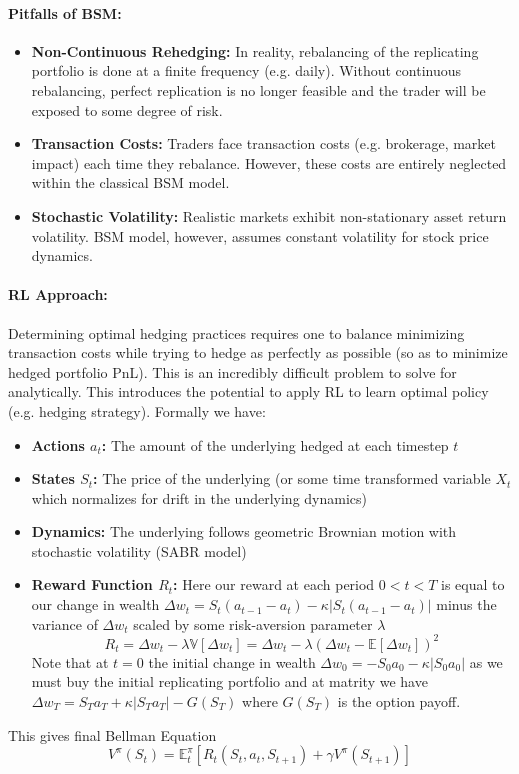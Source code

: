 \documentclass{article}
\begin{document}
\paragraph{Pitfalls of BSM:}
\begin{itemize}
    \item \textbf{Non-Continuous Rehedging:} In reality, rebalancing of the replicating portfolio is done at a finite frequency (e.g. daily). Without continuous rebalancing, perfect replication is no longer feasible and the trader will be exposed to some degree of risk.
    \item \textbf{Transaction Costs:} Traders face transaction costs (e.g. brokerage, market impact) each time they rebalance. However, these costs are entirely neglected within the classical BSM model.
    \item \textbf{Stochastic Volatility:} Realistic markets exhibit non-stationary asset return volatility. BSM model, however, assumes constant volatility for stock price dynamics.
\end{itemize}

\paragraph{RL Approach:} Determining optimal hedging practices requires one to balance minimizing transaction costs while trying to hedge as perfectly as possible (so as to minimize hedged portfolio PnL). This is an incredibly difficult problem to solve for analytically. This introduces the potential to apply RL to learn optimal policy (e.g. hedging strategy). Formally we have:
\begin{itemize}
    \item \textbf{Actions $a_t$:} The amount of the underlying hedged at each timestep $t$
    \item \textbf{States $S_t$:} The price of the underlying (or some time transformed variable $X_t$ which normalizes for drift in the underlying dynamics)
    \item \textbf{Dynamics:} The underlying follows geometric Brownian motion with stochastic volatility (SABR model)
    \item \textbf{Reward Function $R_t$:}
    Here our reward at each period $0<t<T$ is equal to our change in wealth $\Delta w_t = S_t(a_{t-1}-a_t)-\kappa|S_t(a_{t-1}-a_t)|$ minus the variance of $\Delta w_t$ scaled by some risk-aversion parameter $\lambda$
    \[R_t = \Delta w_t - \lambda\mathbb{V}[\Delta w_t] = \Delta w_t - \lambda(\Delta w_t-\mathbb{E}[\Delta w_t])^2\]
    Note that at $t=0$ the initial change in wealth $\Delta w_0=-S_0a_0-\kappa |S_0a_0|$ as we must buy the initial replicating portfolio and at matrity we have  $\Delta w_T=S_Ta_T+\kappa |S_Ta_T|-G(S_T)$ where $G(S_T)$ is the option payoff.
\end{itemize}
This gives final Bellman Equation \[V^{\pi}(S_t) = \mathbb{E}^{\pi}_t[R_t(S_t,a_t,S_{t+1})+\gamma V^{\pi}(S_{t+1})]\]
\end{document}
